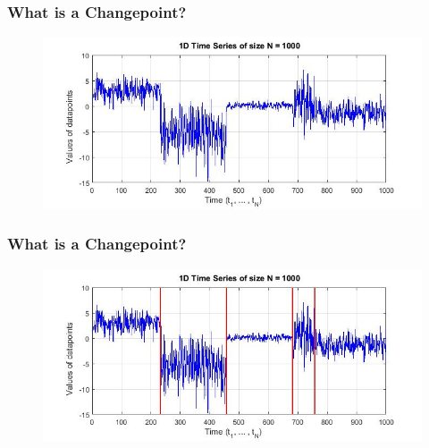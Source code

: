 \documentclass{beamer} %
\begin{document}
\begin{frame}
\frametitle{What is a Changepoint?}
\begin{figure}
\centering
\includegraphics[width=12cm]{1d_series_1000.jpg}
\end{figure}
\end{frame}


\begin{frame}
\frametitle{What is a Changepoint?}
\begin{figure}
\centering
\includegraphics[width=12cm]{1d_series_1000_segments.jpg}
\end{figure}
\end{frame}
\end{document}
